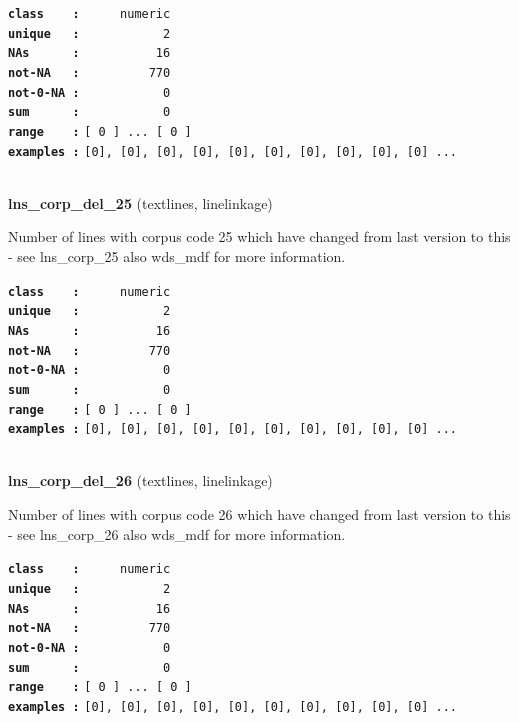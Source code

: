 \documentclass[]{article}
\begin{document}
\textbf{\texttt{class\ \ \ \ :}} \texttt{~~~~~numeric}\\
\textbf{\texttt{unique\ \ \ :}} \texttt{~~~~~~~~~~~2}\\
\textbf{\texttt{NAs\ \ \ \ \ \ :}} \texttt{~~~~~~~~~~16}\\
\textbf{\texttt{not-NA\ \ \ :}} \texttt{~~~~~~~~~770}\\
\textbf{\texttt{not-0-NA\ :}} \texttt{~~~~~~~~~~~0}\\
\textbf{\texttt{sum\ \ \ \ \ \ :}} \texttt{~~~~~~~~~~~0}\\
\textbf{\texttt{range\ \ \ \ :}}
\texttt{{[}\ 0\ {]}\ ...\ {[}\ 0\ {]}}\\
\textbf{\texttt{examples\ :}}
\texttt{{[}0{]},\ {[}0{]},\ {[}0{]},\ {[}0{]},\ {[}0{]},\ {[}0{]},\ {[}0{]},\ {[}0{]},\ {[}0{]},\ {[}0{]}\ ...}\\

~

\textbf{lns\_corp\_del\_25} (textlines, linelinkage)

Number of lines with corpus code 25 which have changed from last version
to this - see lns\_corp\_25 also wds\_mdf for more information.

\textbf{\texttt{class\ \ \ \ :}} \texttt{~~~~~numeric}\\
\textbf{\texttt{unique\ \ \ :}} \texttt{~~~~~~~~~~~2}\\
\textbf{\texttt{NAs\ \ \ \ \ \ :}} \texttt{~~~~~~~~~~16}\\
\textbf{\texttt{not-NA\ \ \ :}} \texttt{~~~~~~~~~770}\\
\textbf{\texttt{not-0-NA\ :}} \texttt{~~~~~~~~~~~0}\\
\textbf{\texttt{sum\ \ \ \ \ \ :}} \texttt{~~~~~~~~~~~0}\\
\textbf{\texttt{range\ \ \ \ :}}
\texttt{{[}\ 0\ {]}\ ...\ {[}\ 0\ {]}}\\
\textbf{\texttt{examples\ :}}
\texttt{{[}0{]},\ {[}0{]},\ {[}0{]},\ {[}0{]},\ {[}0{]},\ {[}0{]},\ {[}0{]},\ {[}0{]},\ {[}0{]},\ {[}0{]}\ ...}\\

~

\textbf{lns\_corp\_del\_26} (textlines, linelinkage)

Number of lines with corpus code 26 which have changed from last version
to this - see lns\_corp\_26 also wds\_mdf for more information.

\textbf{\texttt{class\ \ \ \ :}} \texttt{~~~~~numeric}\\
\textbf{\texttt{unique\ \ \ :}} \texttt{~~~~~~~~~~~2}\\
\textbf{\texttt{NAs\ \ \ \ \ \ :}} \texttt{~~~~~~~~~~16}\\
\textbf{\texttt{not-NA\ \ \ :}} \texttt{~~~~~~~~~770}\\
\textbf{\texttt{not-0-NA\ :}} \texttt{~~~~~~~~~~~0}\\
\textbf{\texttt{sum\ \ \ \ \ \ :}} \texttt{~~~~~~~~~~~0}\\
\textbf{\texttt{range\ \ \ \ :}}
\texttt{{[}\ 0\ {]}\ ...\ {[}\ 0\ {]}}\\
\textbf{\texttt{examples\ :}}
\texttt{{[}0{]},\ {[}0{]},\ {[}0{]},\ {[}0{]},\ {[}0{]},\ {[}0{]},\ {[}0{]},\ {[}0{]},\ {[}0{]},\ {[}0{]}\ ...}\\
\end{document}
